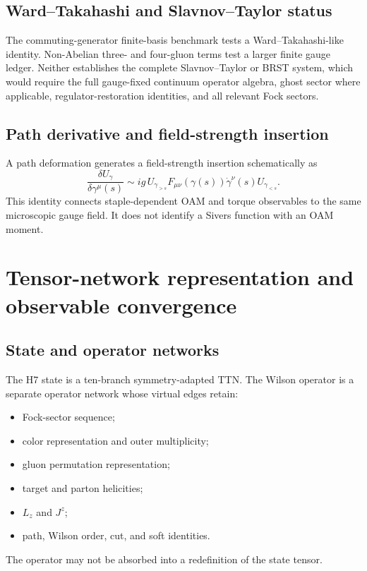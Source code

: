 \documentclass[11pt]{article}
\begin{document}
\subsection{Ward--Takahashi and Slavnov--Taylor status}

The commuting-generator finite-basis benchmark tests a Ward--Takahashi-like
identity.  Non-Abelian three- and four-gluon terms test a larger finite gauge
ledger.  Neither establishes the complete Slavnov--Taylor or BRST system,
which would require the full gauge-fixed continuum operator algebra, ghost
sector where applicable, regulator-restoration identities, and all relevant
Fock sectors.

\subsection{Path derivative and field-strength insertion}

A path deformation generates a field-strength insertion schematically as
\begin{equation}
 \frac{\delta U_\gamma}{\delta\gamma^\mu(s)}
 \sim
 ig\,U_{\gamma_{>s}}F_{\mu\nu}(\gamma(s))
 \dot\gamma^\nu(s)U_{\gamma_{<s}}.
 \label{eq:path-derivative}
\end{equation}
This identity connects staple-dependent OAM and torque observables to the same
microscopic gauge field.  It does not identify a Sivers function with an OAM
moment.

\section{Tensor-network representation and observable convergence}
\label{sec:tn}

\subsection{State and operator networks}

The H7 state is a ten-branch symmetry-adapted TTN.  The Wilson operator is a
separate operator network whose virtual edges retain:
\begin{itemize}
 \item Fock-sector sequence;
 \item color representation and outer multiplicity;
 \item gluon permutation representation;
 \item target and parton helicities;
 \item \(L_z\) and \(J^z\);
 \item path, Wilson order, cut, and soft identities.
\end{itemize}
The operator may not be absorbed into a redefinition of the state tensor.
\end{document}
